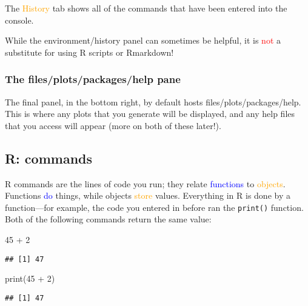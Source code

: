 \documentclass[
]{article}
\newenvironment{Shaded}{\begin{snugshade}}{\end{snugshade}}
\newcommand{\DecValTok}[1]{\textcolor[rgb]{0.00,0.00,0.81}{#1}}
\newcommand{\FunctionTok}[1]{\textcolor[rgb]{0.00,0.00,0.00}{#1}}
\newcommand{\NormalTok}[1]{#1}
\newcommand{\SpecialCharTok}[1]{\textcolor[rgb]{0.00,0.00,0.00}{#1}}
\begin{document}
The \textcolor{orange}{History} tab shows all of the commands that have
been entered into the console.

While the environment/history panel can sometimes be helpful, it is
\textcolor{red}{not} a substitute for using R scripts or Rmarkdown!

\hypertarget{the-filesplotspackageshelp-pane}{%
\subsubsection{The files/plots/packages/help
pane}\label{the-filesplotspackageshelp-pane}}

The final panel, in the bottom right, by default hosts
files/plots/packages/help. This is where any plots that you generate
will be displayed, and any help files that you access will appear (more
on both of these later!).

\hypertarget{r-commands}{%
\subsection{R: commands}\label{r-commands}}

R commands are the lines of code you run; they relate
\textcolor{blue}{functions} to \textcolor{orange}{objects}. Functions
\textcolor{blue}{do} things, while objects \textcolor{orange}{store}
values. Everything in R is done by a function---for example, the code
you entered in before ran the \texttt{print()} function. Both of the
following commands return the same value:

\begin{Shaded}
\begin{Highlighting}[]
\DecValTok{45} \SpecialCharTok{+} \DecValTok{2}
\end{Highlighting}
\end{Shaded}

\begin{verbatim}
## [1] 47
\end{verbatim}

\begin{Shaded}
\begin{Highlighting}[]
\FunctionTok{print}\NormalTok{(}\DecValTok{45} \SpecialCharTok{+} \DecValTok{2}\NormalTok{)}
\end{Highlighting}
\end{Shaded}

\begin{verbatim}
## [1] 47
\end{verbatim}
\end{document}
